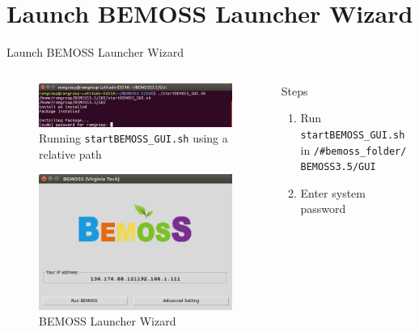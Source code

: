 \documentclass{beamer}
\begin{document}

\section{Launch BEMOSS Launcher Wizard}

\begin{frame}{Launch BEMOSS Launcher Wizard}
\begin{columns}[T]
	\begin{column}{0.5\textwidth}
		\begin{figure}
			\includegraphics[scale=0.2]{../figs/startBEMOSSrelative.png}
			\caption{Running \texttt{startBEMOSS\_GUI.sh} using a relative path}
		\end{figure}
		\begin{figure}
			\includegraphics[scale=0.2]{../figs/bemossWizard.png}
			\caption{BEMOSS Launcher Wizard}
		\end{figure}
	\end{column}
	\begin{column}{0.5\textwidth}
		\begin{block}{Steps}
			\begin{enumerate}
				\item Run \texttt{startBEMOSS\_GUI.sh} in \texttt{/\#bemoss\_folder/
				BEMOSS3.5/GUI}
				\item Enter system password
			\end{enumerate}
		\end{block}
	\end{column}		
\end{columns}
\end{frame}
\end{document}
